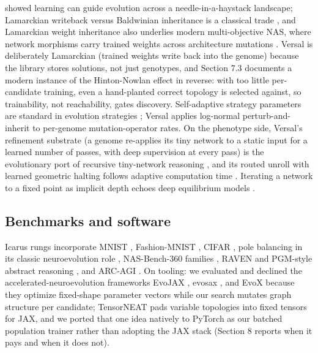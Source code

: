 \documentclass[11pt]{article}
\begin{document}
\citet{hinton1987} showed learning can guide evolution across a needle-in-a-haystack landscape; Lamarckian writeback versus Baldwinian inheritance is a classical trade \citep{whitley1994}, and Lamarckian weight inheritance also underlies modern multi-objective NAS, where network morphisms carry trained weights across architecture mutations \citep{elsken2019a}. Versal is deliberately Lamarckian (trained weights write back into the genome) because the library stores solutions, not just genotypes, and Section 7.3 documents a modern instance of the Hinton-Nowlan effect in reverse: with too little per-candidate training, even a hand-planted correct topology is selected against, so trainability, not reachability, gates discovery. Self-adaptive strategy parameters are standard in evolution strategies \citep{beyer2002, hansen2001}; Versal applies log-normal perturb-and-inherit to per-genome mutation-operator rates. On the phenotype side, Versal's refinement substrate (a genome re-applies its tiny network to a static input for a learned number of passes, with deep supervision at every pass) is the evolutionary port of recursive tiny-network reasoning \citep{jolicoeurmartineau2025, wang2025hrm}, and its routed unroll with learned geometric halting follows adaptive computation time \citep{graves2016, banino2021, dehghani2019}. Iterating a network to a fixed point as implicit depth echoes deep equilibrium models \citep{bai2019}.

\subsection{Benchmarks and software}

Icarus rungs incorporate MNIST \citep{lecun1998}, Fashion-MNIST \citep{xiao2017}, CIFAR \citep{krizhevsky2009}, pole balancing in its classic neuroevolution role \citep{gomez1997}, NAS-Bench-360 families \citep{tu2022}, RAVEN \citep{zhang2019raven} and PGM-style abstract reasoning \citep{barrett2018}, and ARC-AGI \citep{chollet2019, chollet2025, arcprize2026}. On tooling: we evaluated and declined the accelerated-neuroevolution frameworks EvoJAX \citep{tang2022}, evosax \citep{lange2023}, and EvoX \citep{huang2024} because they optimize fixed-shape parameter vectors while our search mutates graph structure per candidate; TensorNEAT \citep{wang2024tensorneat} pads variable topologies into fixed tensors for JAX, and we ported that one idea natively to PyTorch as our batched population trainer rather than adopting the JAX stack (Section 8 reports when it pays and when it does not).
\end{document}
